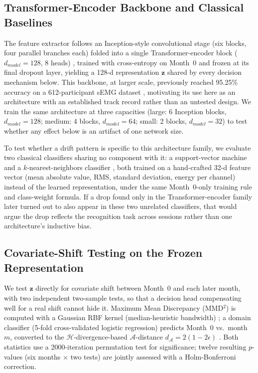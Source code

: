 \documentclass{article}
\begin{document}
\subsection{Transformer-Encoder Backbone and Classical Baselines}
The feature extractor follows an Inception-style convolutional stage \cite{Isabel2023} (six blocks, four parallel branches each) folded into a single Transformer-encoder block ($d_{model}=128$, 8 heads) \cite{Vaswani2017}, trained with cross-entropy on Month~0 and frozen at its final dropout layer, yielding a 128-d representation $\mathbf{z}$ shared by every decision mechanism below. This backbone, at larger scale, previously reached 95.25\% accuracy on a 612-participant sEMG dataset \cite{HGREncoder}, motivating its use here as an architecture with an established track record rather than an untested design. We train the same architecture at three capacities (large: 6 Inception blocks, $d_{model}{=}128$; medium: 4 blocks, $d_{model}{=}64$; small: 2 blocks, $d_{model}{=}32$) to test whether any effect below is an artifact of one network size.

To test whether a drift pattern is specific to this architecture family, we evaluate two classical classifiers sharing no component with it: a support-vector machine \cite{SVM2022} and a $k$-nearest-neighbors classifier \cite{Cipriani2011}, both trained on a hand-crafted 32-d feature vector (mean absolute value, RMS, standard deviation, energy per channel) instead of the learned representation, under the same Month~0-only training rule and class-weight formula. If a drop found only in the Transformer-encoder family later turned out to also appear in these two unrelated classifiers, that would argue the drop reflects the recognition task across sessions rather than one architecture's inductive bias.

\subsection{Covariate-Shift Testing on the Frozen Representation}
We test $\mathbf{z}$ directly for covariate shift between Month~0 and each later month, with two independent two-sample tests, so that a decision head compensating well for a real shift cannot hide it. Maximum Mean Discrepancy (MMD$^2$) is computed with a Gaussian RBF kernel (median-heuristic bandwidth) \cite{Gretton2012MMD}; a domain classifier (5-fold cross-validated logistic regression) predicts Month~0 vs.\ month $m$, converted to the $\mathcal{H}$-divergence-based $\mathcal{A}$-distance $d_{\mathcal{A}}=2(1-2\epsilon)$ \cite{BenDavid2010Domain}. Both statistics use a 2000-iteration permutation test for significance; twelve resulting $p$-values (six months $\times$ two tests) are jointly assessed with a Holm-Bonferroni correction.
\end{document}
